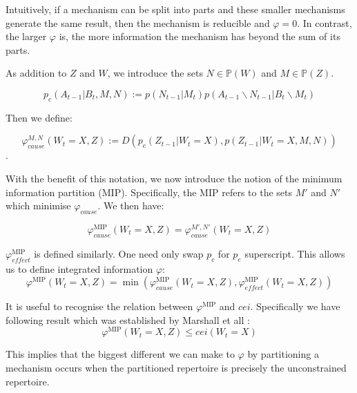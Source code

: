 Intuitively, if a mechanism can be split into parts and these smaller mechanisms generate the same result, then the mechanism is reducible and $\varphi=0$. In contrast, the larger $\varphi$ is, the more information the mechanism has beyond the sum of its parts.

As addition to $Z$ and $W$, we introduce the sets $N \in \mathbb{P}(W)$ and $M \in \mathbb{P}(Z)$.

\begin{equation}
\label{def:preMIP}
p_c(A_{t-1}|B_t ,M, N):= p(N_{t-1}|M_t) p(A_{t-1} \backslash N_{t-1} |B_t \backslash M_t)
\end{equation}

Then we define:

\begin{equation}
\label{def:phi2}
\varphi_{cause}^{M,N}(W_t=X, Z) := D \left( p_c(Z_{t-1}|W_t=X) ,p(Z_{t-1}|W_{t} = X,M,N)  \right)
\end{equation}.

With the benefit of this notation, we now introduce the notion of the minimum information partition (MIP). Specifically, the MIP refers to the sets $M'$ and $N'$ which minimise $\varphi_{cause}$. We then have:

\begin{equation}
\label{def:phi3}
\varphi_{cause}^{\text{MIP}}(W_t=X, Z)  = \varphi_{cause}^{M',N'}(W_t=X, Z) 
\end{equation}

$\varphi^{\text{MIP}}_{effect}$ is defined similarly. One need only swap $p_c$ for $p_e$ superscript. This allows us to define integrated information $\varphi$:
\begin{equation}
\label{def:phi}
\varphi^{\text{MIP}}(W_t=X, Z) = \min \left( \varphi_{cause}^{\text{MIP}}(W_t=X, Z), \varphi_{effect}^{\text{MIP}}(W_t=X, Z)  \right) 
\end{equation}



It is useful to recognise the relation between $\varphi^{\text{MIP}}$ and $cei$. Specifically we have following result which was established by Marshall et all \cite{marshall2016integrated}:
\begin{equation}
\label{eq:bound_phi_cei}
\varphi^{\text{MIP}}(W_t=X, Z) \leq cei(W_t=X) 
\end{equation}

This implies that the biggest different we can make to $\varphi$ by partitioning a mechanism occurs when the partitioned repertoire is precisely the unconstrained repertoire. 



